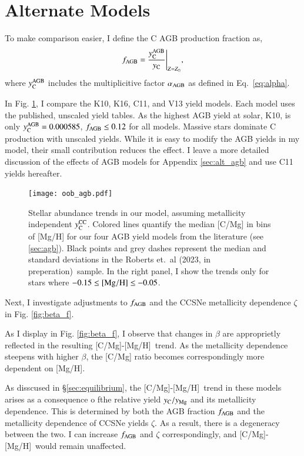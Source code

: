 \documentclass[12pt,oneside]{report}
\newcommand{\caah}{[C/Mg]-[Mg/H]}
\newcommand{\Ycc}{\ensuremath{y_{\rm C}^{\rm CC}}}
\newcommand{\Yct}{\ensuremath{y_{\rm C}}}
\newcommand{\Ycagb}{\ensuremath{y_{\rm C}^{\rm AGB}}}
\newcommand{\citetjack}{Roberts et.\ al (2023, in preperation)}
\begin{document}
\section{Alternate Models}\label{sec:f-z-models}

To make comparison easier, I define the C AGB production fraction as,
\begin{equation}
    f_{\rm AGB} = \frac{\Ycagb}{\Yct}\Bigg\vert_{Z=Z_\odot},
\end{equation}
where  $\Ycagb$ includes the multiplicitive factor $\alpha_{\rm AGB}$ as defined in Eq.~\ref{eq:alpha}.

In Fig. \ref{fig:agb_sims}, I compare the K10, K16, C11, and V13 yield models. Each model uses the published, unscaled yield tables. As the highest AGB yield at solar, K10, is only $\Ycagb=0.000585$, $f_{\rm AGB} \leq 0.12$ for all models. Massive stars dominate C production with unscaled yields.  While it is easy to modify the AGB yields in my model, their small contribution reduces the effect. I leave a more detailed discussion of the effects of AGB models for Appendix \ref{sec:alt_agb} and use C11 yields hereafter.

\begin{figure}
\centering
\texttt{[image: oob\_agb.pdf]}
\caption[AGB GCE Models]{
    Stellar abundance trends in our model, assuming metallicity independent $\Ycc$. Colored lines quantify the median [C/Mg] in bins of [Mg/H] for our four AGB yield models from the literature (see \ref{sec:agb}). Black points and grey dashes represent the median and standard deviations in the \citetjack~sample. In the right panel, I show the trends only for stars where $-0.15\leq {\rm [Mg/H]}\leq -0.05$.
}
\label{fig:agb_sims}
\end{figure}

Next, I investigate adjustments to $f_{\rm AGB}$ and the CCSNe metallicity dependence $\zeta$ in Fig. \ref{fig:beta_f}. 

As I display in Fig. \ref{fig:beta_f}, I observe that changes in $\beta$ are
approprietly reflected in the resulting \caah~trend. As the metallicity
dependence steepens with higher $\beta$, the [C/Mg] ratio becomes
correspondingly more dependent on [Mg/H].

As disscused in \S\ref{sec:equilibrium}, the \caah~trend in these models arises as a consequence o fthe relative yield $y_{\rm C}/y_{\rm Mg}$ and its metallicity dependence. This is determined by both the AGB fraction $f_{\rm AGB}$ and the metallicity dependence of CCSNe yields $\zeta$. As a result, there is a degeneracy between the two. I can increase $f_{\rm AGB}$ and $\zeta$ correspondingly, and \caah~would remain unaffected.
\end{document}

